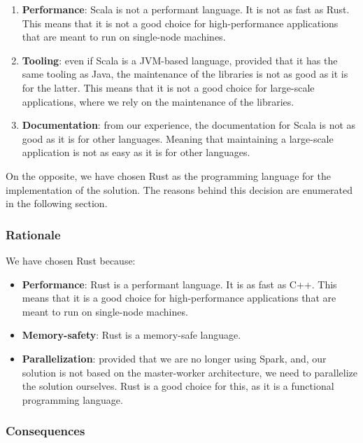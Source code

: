 \begin{enumerate}
    \itemsep0.5em
    \item \textbf{Performance}: Scala is not a performant language. It is not as fast as Rust. This means that it is not a good choice for high-performance applications that are meant to run on single-node machines.
    \item \textbf{Tooling}: even if Scala is a JVM-based language, provided that it has the same tooling as Java, the maintenance of the libraries is not as good as it is for the latter. This means that it is not a good choice for large-scale applications, where we rely on the maintenance of the libraries.
    \item \textbf{Documentation}: from our experience, the documentation for Scala is not as good as it is for other languages. Meaning that maintaining a large-scale application is not as easy as it is for other languages.
\end{enumerate}

On the opposite, we have chosen Rust as the programming language for the implementation of the solution. The reasons behind this decision are enumerated in the following section.

\subsubsection{Rationale}

We have chosen Rust because:

\begin{itemize}
    \itemsep0.5em
    \item \textbf{Performance}: Rust is a performant language. It is as fast as C++. This means that it is a good choice for high-performance applications that are meant to run on single-node machines.
    \item \textbf{Memory-safety}: Rust is a memory-safe language.
    \item \textbf{Parallelization}: provided that we are no longer using Spark, and, our solution is not based on the master-worker architecture, we need to parallelize the solution ourselves. Rust is a good choice for this, as it is a functional programming language.
\end{itemize}

\subsubsection{Consequences}

